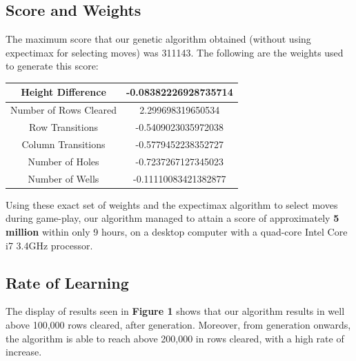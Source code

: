 \documentclass{article} %
\begin{document}
\begin{multicols}{2}
\subsection{Score and Weights}

The maximum score that our genetic algorithm obtained (without using expectimax for selecting moves) was 311143. The following are the weights used to generate this score:



\begin{center}
\begin{tabular} { |c|c| }
 \hline
 Height Difference &  -0.08382226928735714 \\
 \hline
 Number of Rows Cleared & 2.299698319650534 \\
 \hline
 Row Transitions & -0.5409023035972038 \\
 \hline
 Column Transitions & -0.5779452238352727 \\
 \hline
 Number of Holes & -0.7237267127345023 \\
 \hline
 Number of Wells & -0.11110083421382877 \\ 
 \hline
\end{tabular}
\end{center}

\noindent
Using these exact set of weights and the expectimax algorithm to select moves during game-play, our algorithm managed to attain a score of approximately \textbf{5 million} within only 9 hours, on a desktop computer with a quad-core Intel Core i7 3.4GHz processor.

\subsection{Rate of Learning}\label{learning-rate}
The display of results seen in \textbf{Figure 1} shows that our algorithm results in well above 100,000 rows cleared, after  generation. Moreover, from  generation onwards, the algorithm is able to reach above 200,000 in rows cleared, with a high rate of increase.


\end{multicols}
\end{document}
